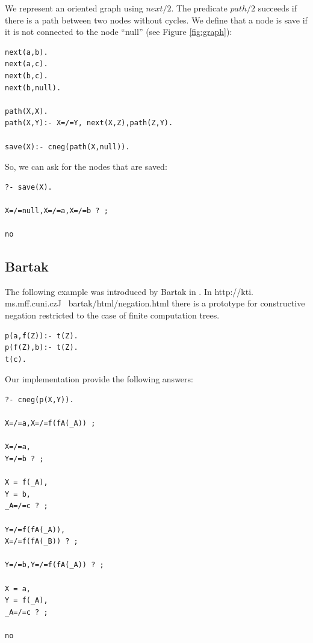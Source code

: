 \documentclass{tlp}
\begin{document}
We represent an oriented graph using $next/2$. The predicate $path/2$ succeeds
if there is a path between two nodes without cycles. We define that a node is
save if it is not connected to the node ``null'' (see Figure \ref{fig:graph}):

\begin{small}
\begin{verbatim}
next(a,b).
next(a,c).
next(b,c).
next(b,null).

path(X,X).
path(X,Y):- X=/=Y, next(X,Z),path(Z,Y).

save(X):- cneg(path(X,null)).
\end{verbatim}
\end{small}
So, we can ask for the nodes that are saved:
\begin{small}
\begin{verbatim}
?- save(X).

X=/=null,X=/=a,X=/=b ? ;

no
\end{verbatim}
\end{small}

\subsection*{Bartak}

The following example was introduced by Bartak in \cite{Bartak}. In
http://kti. ms.mff.cuni.czJ ~bartak/html/negation.html there is a prototype
for constructive negation restricted to the case of finite computation trees.

\begin{small}
\begin{verbatim}
p(a,f(Z)):- t(Z).
p(f(Z),b):- t(Z).
t(c).
\end{verbatim}
\end{small}

Our implementation provide the following answers:

\begin{small}
\begin{verbatim}
?- cneg(p(X,Y)).

X=/=a,X=/=f(fA(_A)) ;

X=/=a,
Y=/=b ? ;

X = f(_A),
Y = b,
_A=/=c ? ;

Y=/=f(fA(_A)),
X=/=f(fA(_B)) ? ;

Y=/=b,Y=/=f(fA(_A)) ? ;

X = a,
Y = f(_A),
_A=/=c ? ;

no
\end{verbatim}
\end{small}
\end{document}
